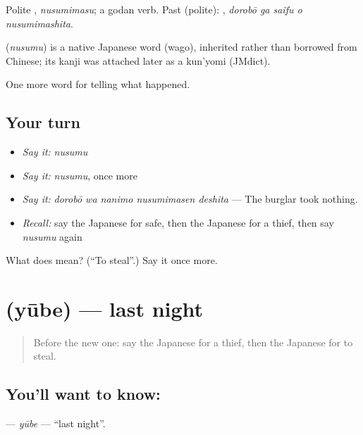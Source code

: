 Polite \textbf{}, \emph{nusumimasu}; a godan verb. Past (polite): \textbf{  }, \emph{dorobō ga saifu o nusumimashita}.

\begin{cousinweb}
\textbf{} (\emph{nusumu}) is a native Japanese word (wago), inherited rather than borrowed from Chinese; its kanji was attached later as a kun'yomi (JMdict).
\end{cousinweb}

\begin{grammarlens}[title={What you've built}]
One more word for telling what happened.
\end{grammarlens}

\subsection*{Your turn}
\begin{itemize}
\raggedright
  \item \emph{Say it:} \emph{nusumu}
  \item \emph{Say it:} \emph{nusumu}, once more
  \item \emph{Say it:} \emph{dorobō wa nanimo nusumimasen deshita} — The burglar took nothing.
  \item \emph{Recall:} say the Japanese for safe, then the Japanese for a thief, then say \emph{nusumu} again
\end{itemize}

\begin{tcolorbox}[breakable,colback=teal!4,colframe=teal!35!black,title={Before you move on}]
What does  mean? (\textquotedblleft{}To steal\textquotedblright{}.) Say it once more.
\end{tcolorbox}
\section[\texorpdfstring{\ja{ゆうべ} (yūbe)}{ゆうべ (yūbe)}]{ (yūbe) — last night}

\label{lesson:JA-C269-yuube}



\begin{quote}
Before the new one: say the Japanese for a thief, then the Japanese for to steal.
\end{quote}

\subsection*{You'll want to know: }
\textbf{} — \emph{yūbe} — \textquotedblleft{}last night\textquotedblright{}.

